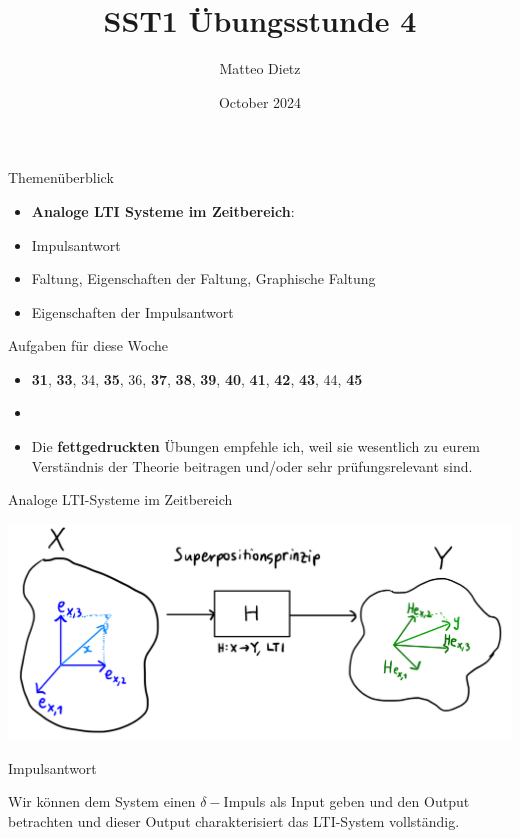 \documentclass[14pt, aspectratio=169, handout]{beamer}
\title{SST1 Übungsstunde 4}
\author{Matteo Dietz}
\date{October 2024}
\begin{document}
\maketitle

\begin{frame}{Themenüberblick}
    \begin{itemize}
        \item \textbf{Analoge LTI Systeme im Zeitbereich}:
        \item[] Impulsantwort
        \item[] Faltung, Eigenschaften der Faltung, Graphische Faltung
        \item[] Eigenschaften der Impulsantwort
    \end{itemize}
\end{frame}

\begin{frame}{Aufgaben für diese Woche}
    \begin{itemize}
        \item[] \textbf{31}, \textbf{33}, 34, \textbf{35}, 36, \textbf{37}, \textbf{38}, \textbf{39}, \textbf{40}, \textbf{41}, \textbf{42}, \textbf{43}, 44, \textbf{45}
        \item[] 
        \item[] Die \textbf{fettgedruckten} Übungen empfehle ich, weil sie wesentlich zu eurem Verständnis der Theorie beitragen und/oder sehr prüfungsrelevant sind.
    \end{itemize}
\end{frame}

\begin{frame}{Analoge LTI-Systeme im Zeitbereich}
    \begin{center}
        \includegraphics[width=0.8\linewidth]{figures/Superposition.jpeg}
    \end{center}
\end{frame}

\begin{frame}{Impulsantwort}

\vspace*{1cm}
Wir können dem System einen $\delta-$Impuls als Input geben und den Output betrachten und dieser Output charakterisiert das LTI-System vollständig.
\end{frame}
\end{document}
